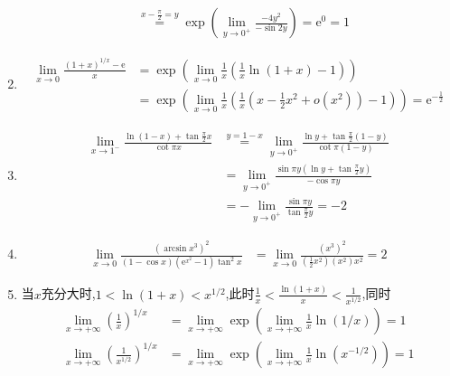 \begin{solution}
\begin{enumerate}
\begin{align*}
                                                                     & \stackrel{x - \frac{\pi}{2} = y}{=} \exp\left(\lim_{y \to 0^+} \frac{-4y^2}{-\sin 2y}\right) = \mathrm{e}^0 = 1
              \end{align*}
        \item \begin{align*}
                  \lim_{x \to 0} \frac{\left(1 + x\right)^{1/x} - \mathrm{e}}{x} & = \exp\left(\lim_{x \to 0} \frac{1}{x} \left(\frac{1}{x} \ln(1 + x) - 1\right)\right)                                                           \\
                                                                                 & = \exp\left(\lim_{x \to 0} \frac{1}{x} \left(\frac{1}{x} \left(x - \frac{1}{2}x^2 + o(x^2)\right) - 1\right)\right) = \mathrm{e}^{-\frac{1}{2}}
              \end{align*}
        \item \begin{align*}
                  \lim_{x \to 1^-} \frac{\ln(1 - x) + \tan \frac{\pi}{2} x}{\cot \pi x} & \stackrel{y=1-x}{=} \lim_{y \to 0^+} \frac{\ln y + \tan \frac{\pi}{2} (1-y)}{\cot \pi (1-y)} \\
                                                                                        & = \lim_{y \to 0^+} \frac{\sin \pi y(\ln y + \tan \frac{\pi}{2} y)}{-\cos \pi y}              \\ %
                                                                                        & = -\lim_{y \to 0^+} \frac{\sin \pi y}{\tan \frac{\pi}{2} y} = -2
              \end{align*}
        \item \begin{align*}
                  \lim_{x \to 0} \frac{(\arcsin x^3)^2}{(1 - \cos x)(\mathrm{e}^{x^2} - 1) \tan^2 x} & = \lim_{x \to 0} \frac{(x^3)^2}{(\frac{1}{2} x^2)(x^2) x^2} = 2
              \end{align*}
        \item 当$x$充分大时,$1 < \ln(1+x) < x^{1/2}$,此时$\frac{1}{x} < \frac{\ln(1+x)}{x} < \frac{1}{x^{1/2}}$,同时
              \begin{align*}
                  \lim_{x \to +\infty} \left(\frac{1}{x}\right)^{1/x}       & = \lim_{x \to +\infty} \exp\left(\lim_{x \to +\infty} \frac{1}{x} \ln(1/x)\right) = 1      \\
                  \lim_{x \to +\infty} \left(\frac{1}{x^{1/2}}\right)^{1/x} & = \lim_{x \to +\infty} \exp\left(\lim_{x \to +\infty} \frac{1}{x} \ln(x^{-1/2})\right) = 1

\end{align*}
\end{enumerate}
\end{solution}
